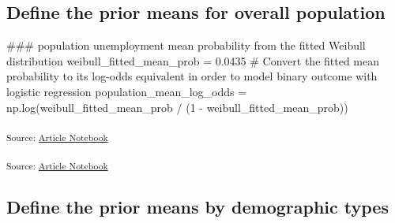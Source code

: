 \documentclass[
]{agujournal2019}
\newenvironment{Shaded}{\begin{snugshade}}{\end{snugshade}}
\newcommand{\CommentTok}[1]{\textcolor[rgb]{0.37,0.37,0.37}{#1}}
\newcommand{\DecValTok}[1]{\textcolor[rgb]{0.68,0.00,0.00}{#1}}
\newcommand{\FloatTok}[1]{\textcolor[rgb]{0.68,0.00,0.00}{#1}}
\newcommand{\NormalTok}[1]{\textcolor[rgb]{0.00,0.23,0.31}{#1}}
\newcommand{\OperatorTok}[1]{\textcolor[rgb]{0.37,0.37,0.37}{#1}}
\begin{document}
\subsection{Define the prior means for overall
population}\label{define-the-prior-means-for-overall-population}

\begin{Shaded}
\begin{Highlighting}[]
\CommentTok{\#\#\# population unemployment mean probability from the fitted Weibull distribution}
\NormalTok{weibull\_fitted\_mean\_prob }\OperatorTok{=} \FloatTok{0.0435}
\CommentTok{\# Convert the fitted mean probability to its log{-}odds equivalent in order to model binary outcome with logistic regression}
\NormalTok{population\_mean\_log\_odds }\OperatorTok{=}\NormalTok{ np.log(weibull\_fitted\_mean\_prob }\OperatorTok{/}\NormalTok{ (}\DecValTok{1} \OperatorTok{{-}}\NormalTok{ weibull\_fitted\_mean\_prob))}
\end{Highlighting}
\end{Shaded}

\textsubscript{Source:
\href{https://mw1296.github.io/dsan5650_social_causal_inference/index.qmd.html}{Article
Notebook}}

\textsubscript{Source:
\href{https://mw1296.github.io/dsan5650_social_causal_inference/index.qmd.html}{Article
Notebook}}

\subsection{Define the prior means by demographic
types}\label{define-the-prior-means-by-demographic-types}
\end{document}
